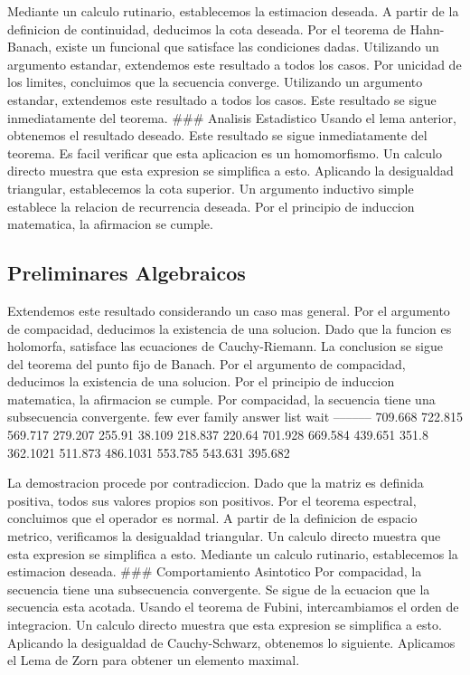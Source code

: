 \documentclass[
]{article}
\begin{document}
Mediante un calculo rutinario, establecemos la estimacion deseada. A
partir de la definicion de continuidad, deducimos la cota deseada. Por
el teorema de Hahn-Banach, existe un funcional que satisface las
condiciones dadas. \pi Utilizando un argumento estandar, extendemos este
resultado a todos los casos. Por unicidad de los limites, concluimos que
la secuencia converge. Utilizando un argumento estandar, extendemos este
resultado a todos los casos. Este resultado se sigue inmediatamente del
teorema. \#\#\# Analisis Estadistico Usando el lema anterior, obtenemos
el resultado deseado. Este resultado se sigue inmediatamente del
teorema. Es facil verificar que esta aplicacion es un homomorfismo. Un
calculo directo muestra que esta expresion se simplifica a esto.
Aplicando la desigualdad triangular, establecemos la cota superior. Un
argumento inductivo simple establece la relacion de recurrencia deseada.
Por el principio de induccion matematica, la afirmacion se cumple.

\subsection{Preliminares Algebraicos}\label{preliminares-algebraicos}

Extendemos este resultado considerando un caso mas general. Por el
argumento de compacidad, deducimos la existencia de una solucion. Dado
que la funcion es holomorfa, satisface las ecuaciones de Cauchy-Riemann.
La conclusion se sigue del teorema del punto fijo de Banach. Por el
argumento de compacidad, deducimos la existencia de una solucion. Por el
principio de induccion matematica, la afirmacion se cumple. Por
compacidad, la secuencia tiene una subsecuencia convergente. \textbar{}
few \textbar{} ever \textbar{} family \textbar{} answer \textbar{} list
\textbar{} wait \textbar{}
\textbar--\textbar--\textbar--\textbar--\textbar--\textbar--\textbar{}
\textbar{} 709.668 \textbar{} 722.815 \textbar{} 569.717 \textbar{}
279.207 \textbar{} 255.91 \textbar{} 38.109 \textbar{} \textbar{}
218.837 \textbar{} 220.64 \textbar{} 701.928 \textbar{} 669.584
\textbar{} 439.651 \textbar{} 351.8 \textbar{} \textbar{} 362.1021
\textbar{} 511.873 \textbar{} 486.1031 \textbar{} 553.785 \textbar{}
543.631 \textbar{} 395.682 \textbar{}

La demostracion procede por contradiccion. Dado que la matriz es
definida positiva, todos sus valores propios son positivos. Por el
teorema espectral, concluimos que el operador es normal. \infty A partir
de la definicion de espacio metrico, verificamos la desigualdad
triangular. Un calculo directo muestra que esta expresion se simplifica
a esto. Mediante un calculo rutinario, establecemos la estimacion
deseada. \#\#\# Comportamiento Asintotico Por compacidad, la secuencia
tiene una subsecuencia convergente. Se sigue de la ecuacion que la
secuencia esta acotada. Usando el teorema de Fubini, intercambiamos el
orden de integracion. Un calculo directo muestra que esta expresion se
simplifica a esto. Aplicando la desigualdad de Cauchy-Schwarz, obtenemos
lo siguiente. Aplicamos el Lema de Zorn para obtener un elemento
maximal.
\end{document}
